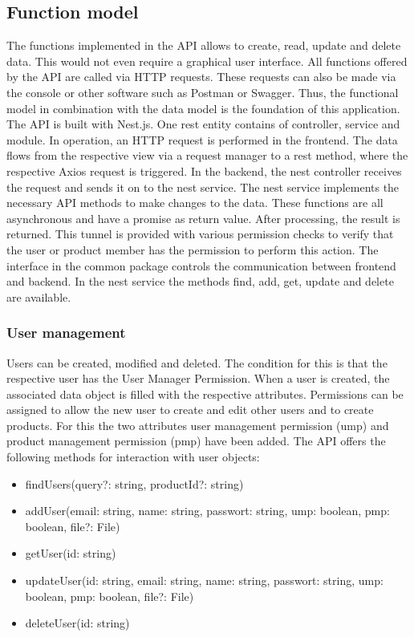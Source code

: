     \subsection*{Function model} 
    The functions implemented in the API allows to create, read, update and delete data. This would not even require a graphical user interface. All functions offered by the API are called via HTTP requests. These requests can also be made via the console or other software such as Postman or Swagger. Thus, the functional model in combination with the data model is the foundation of this application. The API is built with Nest.js. One rest entity contains of controller, service and module. In operation, an HTTP request is performed in the frontend. The data flows from the respective view via a request manager to a rest method, where the respective Axios request is triggered. In the backend, the nest controller receives the request and sends it on to the nest service. The nest service implements the necessary API methods to make changes to the data. These functions are all asynchronous and have a promise as return value. After processing, the result is returned. This tunnel is provided with various permission checks to verify that the user or product member has the permission to perform this action. The interface in the common package controls the communication between frontend and backend. In the nest service the methods find, add, get, update and delete are available. 

    \subsubsection*{User management}
    Users can be created, modified and deleted. The condition for this is that the respective user has the User Manager Permission. When a user is created, the associated data object is filled with the respective attributes. Permissions can be assigned to allow the new user to create and edit other users and to create products. For this the two attributes user management permission (ump) and product management permission (pmp) have been added. The API offers the following methods for interaction with user objects:
    
    \begin{itemize} 
        \item findUsers(query?: string, productId?: string) 
        \item addUser(email: string, name: string, passwort: string, ump: boolean, pmp: boolean, file?: File)
        \item getUser(id: string)
        \item updateUser(id: string, email: string, name: string, passwort: string, ump: boolean, pmp: boolean, file?: File)
        \item deleteUser(id: string)
    \end{itemize}

